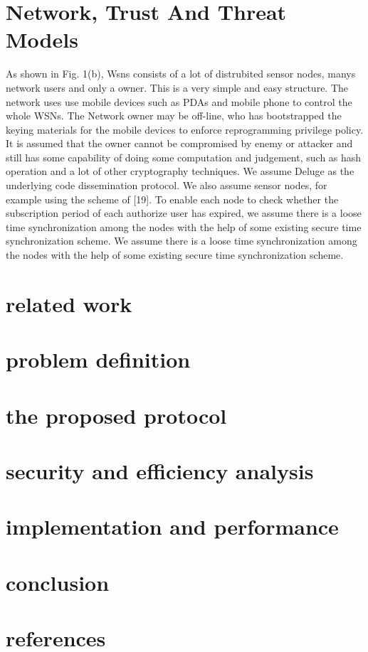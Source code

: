 \documentclass[lnicst,sechang,a4paper]{svmultln}
\begin{document}
\section{Network, Trust And Threat Models}
As shown in Fig. 1(b), Wsns consists of a lot of distrubited sensor nodes, manys network users and only a owner. This is a very simple and easy structure. The network uses use mobile devices such as PDAs and mobile phone to control the whole WSNs. The Network owner may be off-line, who has bootstrapped the keying materials for the mobile devices to enforce reprogramming privilege policy. It is assumed that the owner cannot be compromised by enemy or attacker and still has some capability of doing some computation and judgement, such as hash operation and  a lot of other cryptography techniques. We assume Deluge as the underlying code dissemination protocol. We also assume sensor nodes, for example using the scheme of [19]. To enable each node to check whether the subscription period of each authorize user has expired, we assume there is a loose time synchronization among the nodes with the help of some existing secure time synchronization scheme.
We assume there is a loose time synchronization among the nodes with the help of some existing secure time synchronization scheme.


\section{related work}
\section{problem definition}
\section{the proposed protocol}
\section{security and efficiency analysis}
\section{implementation and performance}
\section{conclusion}
\section{references}
\end{document}
